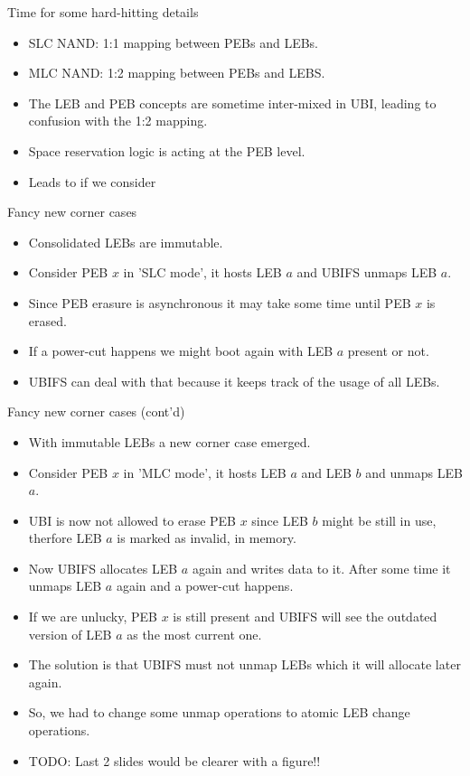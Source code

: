 \documentclass[aspectratio=169,obeyspaces,spaces,hyphens,dvipsnames]{beamer}
\begin{document}
\begin{frame}{Time for some hard-hitting details}
  \begin{itemize}
  \item SLC NAND: 1:1 mapping between PEBs and LEBs.
  \item MLC NAND: 1:2 mapping between PEBs and LEBS.
  \item The LEB and PEB concepts are sometime inter-mixed in UBI, leading
	to confusion with the 1:2 mapping.
  \item Space reservation logic is acting at the PEB level.
  \item Leads to  if we consider 
  \end{itemize}
\end{frame}

\begin{frame}{Fancy new corner cases}
  \begin{itemize}
  \item Consolidated LEBs are immutable.
  \item Consider PEB $x$ in 'SLC mode', it hosts LEB $a$ and UBIFS unmaps LEB $a$.
  \item Since PEB erasure is asynchronous it may take some time until PEB $x$ is erased.
  \item If a power-cut happens we might boot again with LEB $a$ present or not.
  \item UBIFS can deal with that because it keeps track of the usage of all LEBs.
  \end{itemize}
\end{frame}

\begin{frame}{Fancy new corner cases (cont'd)}
  \begin{itemize}
  \item With immutable LEBs a new corner case emerged.
  \item Consider PEB $x$ in 'MLC mode', it hosts LEB $a$ and LEB $b$ and unmaps LEB $a$.
  \item UBI is now not allowed to erase PEB $x$ since LEB $b$ might be still in use, therfore LEB $a$ is marked
        as invalid, in memory.
  \item Now UBIFS allocates LEB $a$ again and writes data to it. After some time it unmaps LEB $a$ again and
        a power-cut happens.
  \item If we are unlucky, PEB $x$ is still present and UBIFS will see the outdated version of LEB $a$ as the most current one.
  \item The solution is that UBIFS must not unmap LEBs which it will allocate later again.
  \item So, we had to change some unmap operations to atomic LEB change operations.
  \item TODO: Last 2 slides would be clearer with a figure!!
  \end{itemize}
\end{frame}
\end{document}
